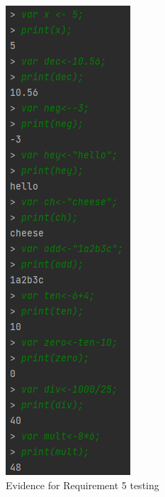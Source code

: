 \documentclass[a4paper, oneside, 11pt]{report}
\begin{document}
\begin{figure}
\includegraphics{Requirement 5.PNG}
\caption{Evidence for Requirement 5 testing}
\end{figure}
\end{document}

